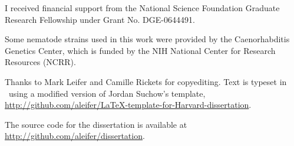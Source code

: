 I received financial support from the National Science Foundation 
Graduate Research Fellowship under Grant No. DGE-0644491.

Some nematode strains used in this work were provided by the Caenorhabditis Genetics Center, which is funded by the NIH National Center for Research Resources (NCRR).

Thanks to Mark Leifer and Camille Rickets for copyediting. Text is typeset in \XeTeX ~using a modified version of Jordan Suchow's template, \url{http://github.com/aleifer/LaTeX-template-for-Harvard-dissertation}.

The source code for the dissertation is available at \url{http://github.com/aleifer/dissertation}.



